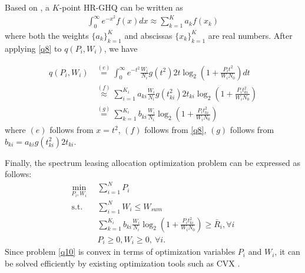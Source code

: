 \documentclass[journal]{IEEEtran}
\begin{document}
Based on \cite{NMSteen}, a $K$-point HR-GHQ can be written as
\begin{align} \label{q8}
\int_{0}^{\infty}e^{-x^2} f\left(x\right) dx \approx \sum\limits_{k = 1}^{K} a_k f\left(x_k\right)
\end{align}
where both the weights $\{a_k\}_{k = 1}^K$ and abscissas $\{x_k\}_{k = 1}^K$ are real numbers. After applying \eqref{q8} to $q\left(P_i, W_i\right)$, we have

\begin{align}
q\left(P_i, W_i\right) &\overset{\left(e\right)}{=} \int_{0}^{\infty}e^{-t^2}\frac{W_i}{N_i} g\left(t^2\right) 2t \log_2\left(1 + \frac{P_it^2}{W_iN_0}\right)dt  \nonumber \\
& \overset{\left(f\right)}{\approx} \sum\limits_{i = 1}^{K_i}a_{ki}\frac{W_i}{N_i}g\left(t_{ki}^2\right)2t_{ki}\log_2\left(1 + \frac{P_it_{ki}^2}{W_iN_0}\right) \nonumber \\
& \overset{\left(g\right)}{=} \sum\limits_{k = 1}^{K_i}b_{ki}\frac{W_i}{N_i}\log_2\left(1 + \frac{P_it_{ki}^2}{W_iN_0}\right)
\end{align}
where $\left(e\right)$ follows from $x = t^2$, $\left(f\right)$ follows from \eqref{q8}, $\left(g\right)$ follows from $b_{ki} = a_{ki}g\left(t_{ki}^2\right)2t_{ki}$.

Finally, the spectrum leasing allocation optimization problem can be expressed as follows:
\begin{subequations}\label{q10}
	\begin{align}
	\min_{P_i, W_i}\ & \sum\limits_{i = 1}^{N} P_i \label{q10a} \\ \mbox{s.t.} \quad &  \sum\limits_{i = 1}^{N} W_i \leq W_{sum} \label{q10b} \\ \quad &  \sum\limits_{k = 1}^{K_i}b_{ki}\frac{W_i}{N_i}\log_2\left(1 + \frac{P_it_{ki}^2}{W_iN_0}\right) \geq \bar{R}_i, \forall i \label{q10c}\\
	& P_i \geq 0, W_i \geq 0, \ \forall i. \label{q10d}
	\end{align}
\end{subequations}
Since problem \eqref{q10} is convex in terms of optimization variables $P_i$ and $W_i$, it can be solved efficiently by existing optimization tools such as CVX \cite{SBoyd1}.
\end{document}
